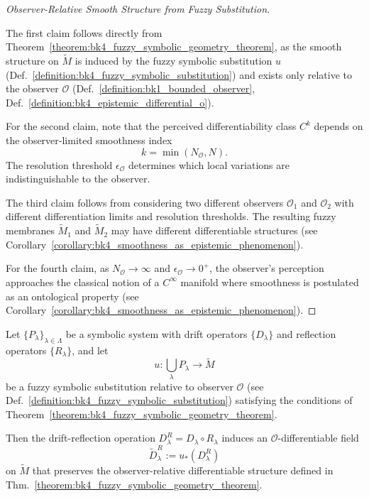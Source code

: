 \begin{proof}[Observer-Relative Smooth Structure from Fuzzy Substitution]
\label{proof:bk4_observer_relative_smoothness}
\leavevmode

The first claim follows directly from Theorem~\ref{theorem:bk4_fuzzy_symbolic_geometry_theorem}, as the smooth structure on $\tilde{M}$ is induced by the fuzzy symbolic substitution $u$ (Def.~\ref{definition:bk4_fuzzy_symbolic_substitution}) and exists only relative to the observer $\mathcal{O}$ (Def.~\ref{definition:bk1_bounded_observer}, Def.~\ref{definition:bk4_epistemic_differential_o}).

For the second claim, note that the perceived differentiability class \( C^k \) depends on the observer-limited smoothness index
\[
k = \min(N_\mathcal{O}, N).
\]
The resolution threshold \( \epsilon_\mathcal{O} \) determines which local variations are indistinguishable to the observer.

The third claim follows from considering two different observers $\mathcal{O}_1$ and $\mathcal{O}_2$ with different differentiation limits and resolution thresholds. The resulting fuzzy membranes $\tilde{M}_1$ and $\tilde{M}_2$ may have different differentiable structures (see Corollary~\ref{corollary:bk4_smoothness_as_epistemic_phenomenon}).

For the fourth claim, as $N_\mathcal{O} \to \infty$ and $\epsilon_\mathcal{O} \to 0^+$, the observer's perception approaches the classical notion of a $C^\infty$ manifold where smoothness is postulated as an ontological property (see Corollary~\ref{corollary:bk4_smoothness_as_epistemic_phenomenon}).

\end{proof}

\begin{theorem}
\label{theorem:bk4_compatibility_drift_reflective_operations}

Let $\{P_\lambda\}_{\lambda \in \Lambda}$ be a symbolic system with drift operators $\{D_\lambda\}$ and reflection operators $\{R_\lambda\}$, and let
\[
u : \bigcup_\lambda P_\lambda \to \tilde{M}
\]
be a fuzzy symbolic substitution relative to observer $\mathcal{O}$ (see Def.~\ref{definition:bk4_fuzzy_symbolic_substitution}) satisfying the conditions of Theorem~\ref{theorem:bk4_fuzzy_symbolic_geometry_theorem}.

Then the drift-reflection operation \( D_\lambda^R = D_\lambda \circ R_\lambda \) induces an $\mathcal{O}$-differentiable field
\[
\tilde{D}_\lambda^R := u_*(D_\lambda^R)
\]
on $\tilde{M}$ that preserves the observer-relative differentiable structure defined in Thm.~\ref{theorem:bk4_fuzzy_symbolic_geometry_theorem}.
\end{theorem}


